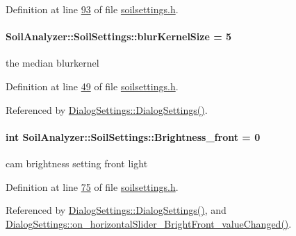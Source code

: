 Definition at line \hyperlink{soilsettings_8h_source_l00093}{93} of file \hyperlink{soilsettings_8h_source}{soilsettings.\+h}.

\hypertarget{class_soil_analyzer_1_1_soil_settings_afa46542d30045e00fadbdd5a6ab9a1e1}{}
\paragraph[{blur\+Kernel\+Size}]{ Soil\+Analyzer\+::\+Soil\+Settings\+::blur\+Kernel\+Size = 5}\label{class_soil_analyzer_1_1_soil_settings_afa46542d30045e00fadbdd5a6ab9a1e1}
the median blurkernel 

Definition at line \hyperlink{soilsettings_8h_source_l00049}{49} of file \hyperlink{soilsettings_8h_source}{soilsettings.\+h}.



Referenced by \hyperlink{dialogsettings_8cpp_source_l00005}{Dialog\+Settings\+::\+Dialog\+Settings()}.

\hypertarget{class_soil_analyzer_1_1_soil_settings_a2989997cfcc00500bba496dd8c8213ce}{}
\paragraph[{Brightness\+\_\+front}]{\setlength{\rightskip}{0pt plus 5cm}int Soil\+Analyzer\+::\+Soil\+Settings\+::\+Brightness\+\_\+front = 0}\label{class_soil_analyzer_1_1_soil_settings_a2989997cfcc00500bba496dd8c8213ce}
cam brightness setting front light 

Definition at line \hyperlink{soilsettings_8h_source_l00075}{75} of file \hyperlink{soilsettings_8h_source}{soilsettings.\+h}.



Referenced by \hyperlink{dialogsettings_8cpp_source_l00005}{Dialog\+Settings\+::\+Dialog\+Settings()}, and \hyperlink{dialogsettings_8cpp_source_l00307}{Dialog\+Settings\+::on\+\_\+horizontal\+Slider\+\_\+\+Bright\+Front\+\_\+value\+Changed()}.

\hypertarget{class_soil_analyzer_1_1_soil_settings_a1411d6f8eadfbedd8e23973b11d00c29}{}
